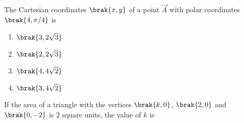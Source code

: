 \item The Cartesian coordinates $\brak{x, y}$ of a point $\vec{A}$ with polar coordinates $\brak{4, \pi/4}$ is

\hfill {}
\begin{multicols}{4}
\begin{enumerate}
\item $\brak{3,2\sqrt{3}}$
\item $\brak{2, 2\sqrt{3}}$
\item $\brak{4,4\sqrt{2}}$
\item $\brak{3,4\sqrt{2}}$
\end{enumerate}
\end{multicols}
\item If the area of a triangle with the vertices $\brak{k, 0}$, $\brak{2, 0}$ and $\brak{0, -2}$ is $2$ square units, the value of $k$ is
\hfill {}

